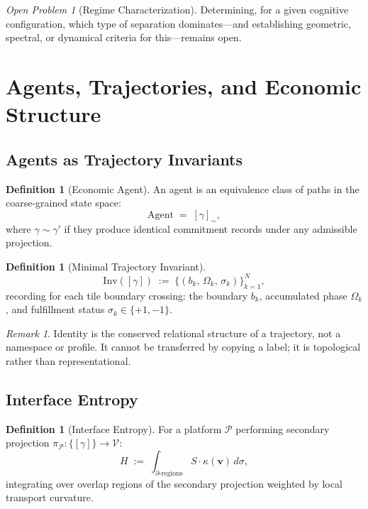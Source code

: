 \documentclass[11pt]{article}
\theoremstyle{plain}
\theoremstyle{definition}
\newtheorem{definition}[theorem]{Definition}
\theoremstyle{remark}
\newtheorem{remark}[theorem]{Remark}
\newtheorem{openproblem}[theorem]{Open Problem}
\newcommand{\vv}{\mathbf{v}}
\newcommand{\Ss}{S}
\begin{document}
\begin{openproblem}[Regime Characterization]
Determining, for a given cognitive configuration, which type of separation
dominates---and establishing geometric, spectral, or dynamical criteria for
this---remains open.
\end{openproblem}

\section{Agents, Trajectories, and Economic Structure}

\subsection{Agents as Trajectory Invariants}

\begin{definition}[Economic Agent]
An agent is an equivalence class of paths in the coarse-grained state space:
\[
  \mathrm{Agent} \;=\; [\gamma]_{\sim},
\]
where $\gamma \sim \gamma'$ if they produce identical commitment records
under any admissible projection.
\end{definition}

\begin{definition}[Minimal Trajectory Invariant]
\[
  \mathrm{Inv}([\gamma]) \;:=\;
  \bigl\{(b_k,\,\Omega_k,\,\sigma_k)\bigr\}_{k=1}^{N},
\]
recording for each tile boundary crossing: the boundary $b_k$, accumulated
phase $\Omega_k$, and fulfillment status $\sigma_k \in \{+1,-1\}$.
\end{definition}

\begin{remark}
Identity is the conserved relational structure of a trajectory, not a
namespace or profile. It cannot be transferred by copying a label; it is
topological rather than representational.
\end{remark}

\subsection{Interface Entropy}

\begin{definition}[Interface Entropy]
For a platform $\mathcal{P}$ performing secondary projection
$\pi_{\mathcal{P}} : \{[\gamma]\} \to \mathcal{V}$:
\[
  H \;:=\; \int_{\partial\text{-regions}} \Ss \cdot \kappa(\vv)\,d\sigma,
\]
integrating over overlap regions of the secondary projection weighted by
local transport curvature.
\end{definition}
\end{document}
